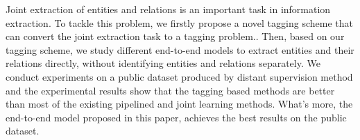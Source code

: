 Joint extraction of entities and relations is an important task in information extraction. To tackle this problem, we firstly propose a novel tagging scheme that can convert the joint extraction task to a tagging problem.. Then, based on our tagging scheme, we study different end-to-end models to extract entities and their relations directly, without identifying entities and relations separately. We conduct experiments on a public dataset produced by distant supervision method and the experimental results show that the tagging based methods are better than most of the existing pipelined and joint learning methods. What's more, the end-to-end model proposed in this paper, achieves the best results on the public dataset.
